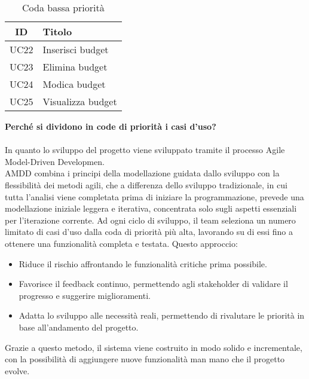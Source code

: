     \begin{table}[H]
        \centering
        \begin{tabular}{|c|l|}
        \hline
        \textbf{ID} & \textbf{Titolo} \\ \hline
        UC22 & Inserisci budget\\ \hline
        UC23 & Elimina budget \\ \hline
        UC24 & Modica budget \\ \hline
        UC25 & Visualizza budget \\ \hline
        \end{tabular}
        \caption{Coda bassa priorità}
    \end{table}
\textbf{Perché si dividono in code di priorità i casi d'uso?}
\\
\\
In quanto lo sviluppo del progetto viene sviluppato tramite il processo Agile Model-Driven Developmen.
\\
AMDD combina i principi della modellazione guidata dallo sviluppo con la flessibilità dei metodi agili, che a differenza dello sviluppo tradizionale, in cui tutta l’analisi viene completata prima di iniziare la programmazione, prevede una modellazione iniziale leggera e iterativa, concentrata solo sugli aspetti essenziali per l’iterazione corrente.
\newline
Ad ogni ciclo di sviluppo, il team seleziona un numero limitato di casi d’uso dalla coda di priorità più alta, lavorando su di essi fino a ottenere una funzionalità completa e testata. Questo approccio:
\begin{itemize}
    \item Riduce il rischio affrontando le funzionalità critiche prima possibile.
    \item Favorisce il feedback continuo, permettendo agli stakeholder di validare il progresso e suggerire miglioramenti.
    \item Adatta lo sviluppo alle necessità reali, permettendo di rivalutare le priorità in base all’andamento del progetto.
\end{itemize}
Grazie a questo metodo, il sistema viene costruito in modo solido e incrementale, con la possibilità di aggiungere nuove funzionalità man mano che il progetto evolve.